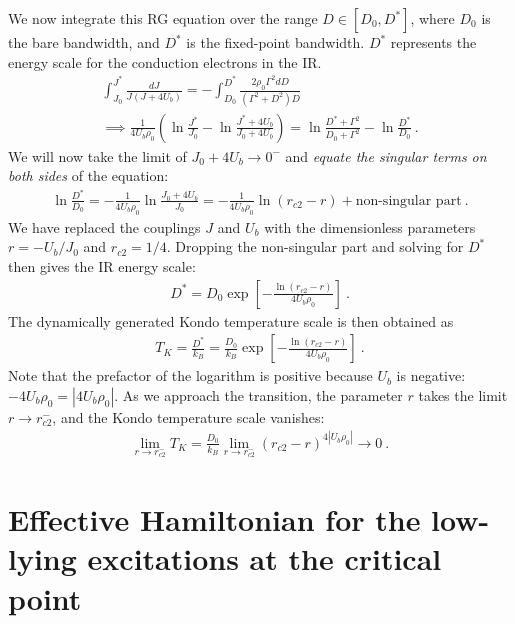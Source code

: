 \documentclass{iopart}
\begin{document}
We now integrate this RG equation over the range \(D \in \left[D_0, D^*\right] \), where \(D_0\) is the bare bandwidth, and \(D^*\) is the fixed-point bandwidth. \(D^*\) represents the energy scale for the conduction electrons in the IR.
\begin{eqnarray}
	\int_{J_0}^{J^*} \frac{d J}{J\left(J + 4U_b\right)} = -\int_{D_0}^{D^*}\frac{2\rho_0 \Gamma^2 d D}{\left( \Gamma^2 + D^2 \right) D} \nonumber\\
	\implies \frac{1}{4 U_b \rho_0} \left(\ln \frac{J^*}{J_0} - \ln \frac{J^* + 4U_b}{J_0 + 4 U_b}\right) = \ln \frac{D^* + \Gamma^2}{D_0 + \Gamma^2} - \ln \frac{D^*}{D_0}~.
\end{eqnarray}
We will now take the limit of \(J_0 + 4U_b \to 0^-\) and {\it equate the singular terms on both sides} of the equation:
\begin{eqnarray}
	\ln \frac{D^*}{D_0} = -\frac{1}{4 U_b \rho_0} \ln \frac{J_0 + 4 U_b}{J_0} = -\frac{1}{4 U_b \rho_0} \ln \left(r_{c2} - r\right) + \text{non-singular part}~.
\end{eqnarray}
We have replaced the couplings \(J\) and \(U_b\) with the dimensionless parameters \(r = -U_b/J_0\) and \(r_{c2} = 1/4\). Dropping the non-singular part and solving for \(D^*\) then gives the IR energy scale:
\begin{eqnarray}
	D^* = D_0 \exp\left[-\frac{\ln\left( r_{c2} - r \right)}{4 U_b \rho_0}\right]~.
\end{eqnarray}
The dynamically generated Kondo temperature scale is then obtained as
\begin{eqnarray}
	T_K = \frac{D^*}{k_B} = \frac{D_0}{k_B} \exp\left[-\frac{\ln\left( r_{c2} - r \right)}{4 U_b \rho_0}\right]~.
\end{eqnarray}
Note that the prefactor of the logarithm is positive because \(U_b\) is negative: \(-4U_b\rho_0 = |4U_b \rho_0|\). As we approach the transition, the parameter \(r\) takes the limit \(r \to r_{c2}^-\), and the Kondo temperature scale vanishes:
\begin{eqnarray}
	\lim_{r \to r_{c2}^-} T_K = \frac{D_0}{k_B} \lim_{r \to r_{c2}^-}\left(r_{c2} - r\right)^{4|U_b\rho_0|} \to 0~.
\end{eqnarray}


\section{Effective Hamiltonian for the low-lying excitations at the critical point}
\label{app-nfl}
\end{document}
